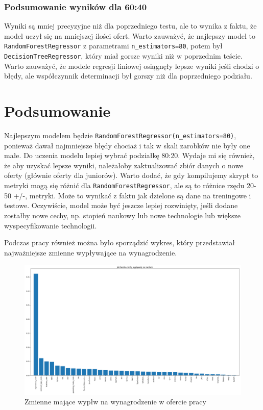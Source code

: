 \documentclass[a4paper]{article}
\begin{document}
\subsubsection{Podsumowanie wyników dla 60:40}


\quad Wyniki są mniej precyzyjne niż dla poprzedniego testu, ale to wynika z faktu, że model uczył się na mniejszej
ilości ofert. Warto zauważyć, że najlepszy model to \texttt{RandomForestRegressor} z parametrami \texttt{n\_estimators=80},
potem był \texttt{DecisionTreeRegressor}, który miał gorsze wyniki niż w poprzednim teście. Warto zauważyć, że modele regresji liniowej osiągnęły lepsze wyniki jeśli chodzi o błędy, ale współczynnik determinacji był gorszy niż dla poprzedniego podziału.

\section{Podsumowanie}
\quad Najlepszym modelem będzie \texttt{RandomForestRegressor(n\_estimators=80)},
ponieważ dawał najmniejsze błędy chociaż i tak w skali zarobków nie były one małe.
Do uczenia modelu lepiej wybrać podziałkę 80:20. Wydaje mi się również, że aby uzyskać lepsze wyniki,
należałoby zaktualizować zbiór danych o nowe oferty (głównie oferty dla juniorów). Warto dodać, że
gdy kompilujemy skrypt to metryki mogą się różnić dla \texttt{RandomForestRegressor}, ale są to różnice rzędu 20-50 +/-, metryki. Może to wynikać z faktu jak dzielone są dane na treningowe i testowe.
Oczywiście, model może być jeszcze lepiej rozwinięty, jeśli dodane zostałby nowe cechy, np. stopień naukowy lub nowe technologie lub większe wyspecyfikowanie technologii.

\quad Podczas pracy również można było sporządzić wykres, który przedstawiał najważniejsze zmienne wypływające na wynagrodzenie.

\begin{figure}[H]
    \centering
    \includegraphics[width=\textwidth]{../analysis/plots/wyniki/importance_of_vars.png}
    \caption{Zmienne mające wypłw na wynagrodzenie w ofercie pracy}
\end{figure}
\end{document}
